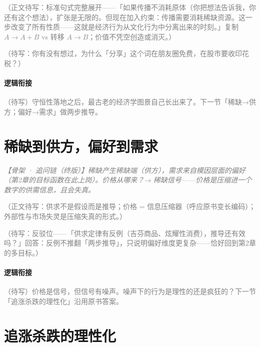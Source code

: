 \documentclass[../../main2.tex]{subfiles}
\begin{document}
	\textcolor{gray}{（正文待写：标准句式完整展开——「如果传播不消耗原体（你把想法告诉我，你还有这个想法），扩张是无限的。但现在加入约束：传播需要消耗稀缺资源。这一步改变了所有性质——这就是经济行为从文化行为中分离出来的时刻。」复制 $A \to A+B$ vs 转移 $A \to B$；价值不凭空创造或消灭。）}

	\begin{readingnote}
		\textcolor{gray}{（待写：你有没有想过，为什么「分享」这个词在朋友圈免费，在股市要收印花税？）}
	\end{readingnote}

	\paragraph*{逻辑衔接}
	\textcolor{gray}{（待写）守恒性落地之后，最古老的经济学图景自己长出来了。下一节「稀缺→供方；偏好→需求」做两步推导。}

	\section{稀缺到供方，偏好到需求}
	\label{sec:econ-supplydemand}

	\textcolor{gray}{\textit{【骨架 · 追问链（终版）】稀缺产生稀缺端（供方），需求来自模因层面的偏好（第2章的目标函数在此上岗）。价格从哪来？→ 稀缺信号——价格是压缩进一个数字的供需信息，且会失真。}}

	\textcolor{gray}{（正文待写：供求不是假设而是推导；价格 = 信息压缩器（呼应原书变长编码）；外部性与市场失灵是压缩失真的形式。）}

	\begin{questionbox}
		\textcolor{gray}{（待写：反驳位——「供求定律有反例（吉芬商品、炫耀性消费），推导还有效吗？」回答：反例不推翻「两步推导」，只说明偏好维度更复杂——恰好回到第2章的多目标。）}
	\end{questionbox}

	\paragraph*{逻辑衔接}
	\textcolor{gray}{（待写）价格是信号，但信号有噪声。噪声下的行为是理性的还是疯狂的？下一节「追涨杀跌的理性化」沿用原书答案。}

	\section{追涨杀跌的理性化}
	\label{sec:econ-herding}
\end{document}
